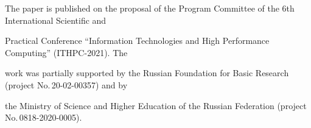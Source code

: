 







 \Ack


\noindent


The paper is published on the proposal of the Program Committee of the 6th International Scientific and 


Practical Conference ``Information Technologies and High Performance Computing'' (ITHPC-2021). The 


work was partially supported by the Russian Foundation for Basic Research (project No.\,20-02-00357) and by 


the Ministry of Science and Higher Education of the Russian Federation (project No.\,0818-2020-0005).


 













\renewcommand{\bibname}{\protect\rmfamily References}







